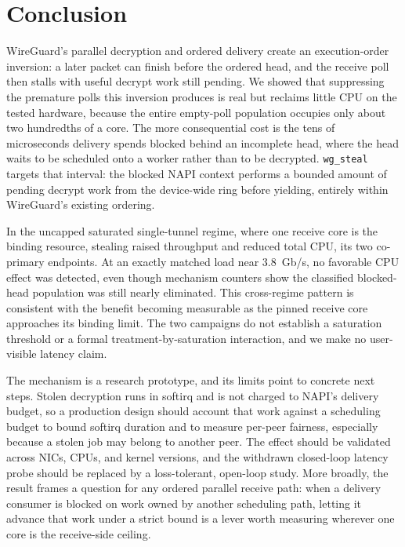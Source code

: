 \section{Conclusion}
\label{sec:conclusion}

WireGuard's parallel decryption and ordered delivery create an execution-order
inversion: a later packet can finish before the ordered head, and the receive
poll then stalls with useful decrypt work still pending. We showed that
suppressing the premature polls this inversion produces is real but reclaims
little CPU on the tested hardware, because the entire empty-poll population
occupies only about two hundredths of a core. The more consequential cost is the
tens of microseconds delivery spends blocked behind an incomplete head, where
the head waits to be scheduled onto a worker rather than to be decrypted.
\texttt{wg\_steal} targets that interval: the blocked NAPI context performs a
bounded amount of pending decrypt work from the device-wide ring before
yielding, entirely within WireGuard's existing ordering.

In the uncapped saturated single-tunnel regime, where one receive core is the
binding resource, stealing raised throughput and reduced total CPU, its two
co-primary endpoints. At an exactly matched load near 3.8~Gb/s, no favorable CPU
effect was detected, even though mechanism counters show the classified
blocked-head population was still nearly eliminated. This cross-regime pattern is
consistent with the benefit becoming measurable as the pinned receive core
approaches its binding limit. The two campaigns do not establish a saturation
threshold or a formal treatment-by-saturation interaction, and we make no
user-visible latency claim.

The mechanism is a research prototype, and its limits point to concrete next
steps. Stolen decryption runs in softirq and is not charged to NAPI's delivery
budget, so a production design should account that work against a scheduling
budget to bound softirq duration and to measure per-peer fairness, especially
because a stolen job may belong to another peer. The effect should be validated
across NICs, CPUs, and kernel versions, and the withdrawn closed-loop latency
probe should be replaced by a loss-tolerant, open-loop study. More broadly, the
result frames a question for any ordered parallel receive path: when a delivery
consumer is blocked on work owned by another scheduling path, letting it advance
that work under a strict bound is a lever worth measuring wherever one core is
the receive-side ceiling.
